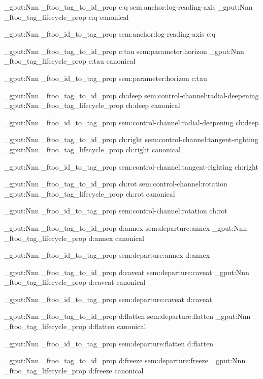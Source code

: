 \prop_gput:Nnn \g_ftoo_tag_to_id_prop { c:q } { sem:anchor:log-reading-axis }
\prop_gput:Nnn \g_ftoo_tag_lifecycle_prop { c:q } { canonical }

\prop_gput:Nnn \g_ftoo_id_to_tag_prop { sem:anchor:log-reading-axis } { c:q }


\prop_gput:Nnn \g_ftoo_tag_to_id_prop { c:tau } { sem:parameter:horizon }
\prop_gput:Nnn \g_ftoo_tag_lifecycle_prop { c:tau } { canonical }

\prop_gput:Nnn \g_ftoo_id_to_tag_prop { sem:parameter:horizon } { c:tau }


\prop_gput:Nnn \g_ftoo_tag_to_id_prop { ch:deep } { sem:control-channel:radial-deepening }
\prop_gput:Nnn \g_ftoo_tag_lifecycle_prop { ch:deep } { canonical }

\prop_gput:Nnn \g_ftoo_id_to_tag_prop { sem:control-channel:radial-deepening } { ch:deep }


\prop_gput:Nnn \g_ftoo_tag_to_id_prop { ch:right } { sem:control-channel:tangent-righting }
\prop_gput:Nnn \g_ftoo_tag_lifecycle_prop { ch:right } { canonical }

\prop_gput:Nnn \g_ftoo_id_to_tag_prop { sem:control-channel:tangent-righting } { ch:right }


\prop_gput:Nnn \g_ftoo_tag_to_id_prop { ch:rot } { sem:control-channel:rotation }
\prop_gput:Nnn \g_ftoo_tag_lifecycle_prop { ch:rot } { canonical }

\prop_gput:Nnn \g_ftoo_id_to_tag_prop { sem:control-channel:rotation } { ch:rot }


\prop_gput:Nnn \g_ftoo_tag_to_id_prop { d:annex } { sem:departure:annex }
\prop_gput:Nnn \g_ftoo_tag_lifecycle_prop { d:annex } { canonical }

\prop_gput:Nnn \g_ftoo_id_to_tag_prop { sem:departure:annex } { d:annex }


\prop_gput:Nnn \g_ftoo_tag_to_id_prop { d:caveat } { sem:departure:caveat }
\prop_gput:Nnn \g_ftoo_tag_lifecycle_prop { d:caveat } { canonical }

\prop_gput:Nnn \g_ftoo_id_to_tag_prop { sem:departure:caveat } { d:caveat }


\prop_gput:Nnn \g_ftoo_tag_to_id_prop { d:flatten } { sem:departure:flatten }
\prop_gput:Nnn \g_ftoo_tag_lifecycle_prop { d:flatten } { canonical }

\prop_gput:Nnn \g_ftoo_id_to_tag_prop { sem:departure:flatten } { d:flatten }


\prop_gput:Nnn \g_ftoo_tag_to_id_prop { d:freeze } { sem:departure:freeze }
\prop_gput:Nnn \g_ftoo_tag_lifecycle_prop { d:freeze } { canonical }

